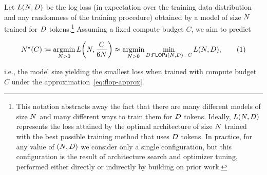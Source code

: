 \documentclass{article}
\newcommand{\neurips}[1]{foo}
\newcommand{\workshop}[1]{baz}
\renewcommand{\neurips}[1]{\ignorespaces}%
\renewcommand{\workshop}[1]{\ignorespaces}%
\renewcommand{\neurips}[1]{\ignorespaces}%
\renewcommand{\workshop}[1]{#1}%
\renewcommand{\neurips}[1]{#1}%
\renewcommand{\workshop}[1]{\ignorespaces}%
\theoremstyle{plain}
\theoremstyle{definition}
\theoremstyle{remark}
\DeclarePairedDelimiter{\prn}{(}{)}
\newcommand\numberthis{\addtocounter{equation}{1}\tag{\theequation}}
\providecommand{\argmin}{\mathop{\rm argmin}}
\newcommand{\defeq}{\coloneqq}
\newcommand{\maybeSubscript}[1]{
  \ifthenelse{\equal{#1}{}}{}{_{#1}}%
}
\newcommand{\params}[1][]{N\maybeSubscript{#1}}
\newcommand{\paramsStar}[1][]{\params[#1]^{\star}}
\newcommand{\tokens}[1][]{D\maybeSubscript{#1}}
\newcommand{\compute}{\mathsf{FLOPs}}
\newcommand{\loss}{L}
\begin{document}
%
Let $\loss(\params,\tokens)$ be the log loss (in expectation over the training data distribution and any randomness of the training procedure) obtained by a model of size $\params$ trained for $\tokens$ tokens.\footnote{This notation abstracts away the fact that there are many different models of size $\params$ and many different ways to train them for $\tokens$ tokens. Ideally, $\loss(\params,\tokens)$ represents the loss attained by the optimal architecture of size $\params$ trained with the best possible training method that uses $\tokens$ tokens. In practice, for any value of $(\params,\tokens)$ we consider only a single configuration, but this configuration is the result of architecture search and optimizer tuning, performed either directly or indirectly by building on prior work.} Assuming a fixed compute budget $C$, we aim to predict
\neurips{
    \[
    \paramsStar(C) \defeq \argmin_{\params > 0} \loss\prn*{\params, \frac{C}{6\params}} \approx \argmin_{\params > 0} \min_{\tokens: \compute(\params,\tokens) = C}\loss\prn*{\params, \tokens},\numberthis \label{eq:N-star-def}
\]
}
\workshop{
    \begin{equation}
        \begin{aligned}
            \paramsStar(C) &\defeq \argmin_{\params > 0} \loss\prn*{\params, \frac{C}{6\params}} \\
            &\approx \argmin_{\params > 0} \min_{\tokens: \compute(\params,\tokens) = C} \loss\prn*{\params, \tokens}
        \end{aligned}
        \numberthis \label{eq:N-star-def}
    \end{equation}
}
i.e., the model size yielding the smallest loss when trained with compute budget $C$ under the approximation~\eqref{eq:flop-approx}. 
\end{document}
